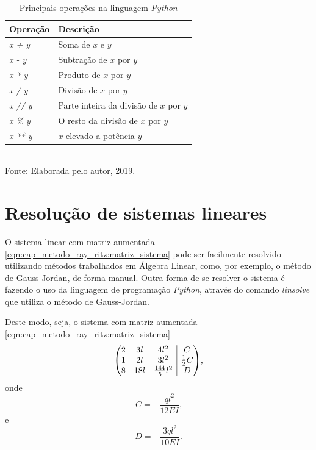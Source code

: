 \documentclass[
	12pt,				%
	openright,			%
    twoside,			%
	a4paper,			%
	chapter=TITLE,		%
	english,			%
	french,				%
	spanish,			%
	brazil				%
	]{abntex2}
\makeatletter
\newenvironment{amatrix}[1]{%
	\left(\begin{array}{@{}*{#1}{c}|c@{}}
}{%
	\end{array}\right)
}
\numberwithin{lema}{chapter}
\numberwithin{teorema}{chapter}
\numberwithin{definicao}{chapter}
\numberwithin{exemplo}{chapter}
\numberwithin{figure}{chapter}
\makeatother
\begin{document}
\begin{apendicesenv}
{	\begin{table}[h]
		\caption{Principais operações na linguagem \textit{Python}}
		\ABNTEXfontereduzida
		\centering
		\begin{tabular}{p{}p{}}
			\toprule
			\textbf{Operação} & \textbf{Descrição}\\
			\midrule
			\ABNTEXfontereduzida
			\textit{x + y} & Soma de $x$ e $y$\\
			\textit{x - y} & Subtração de $x$ por $y$\\
			\textit{x * y} & Produto de $x$ por $y$\\
			\textit{x / y} & Divisão de $x$ por $y$\\
			\textit{x // y} & Parte inteira da divisão de $x$ por $y$\\
			\textit{x \% y} & O resto da divisão de $x$ por $y$\\
			\textit{x ** y} & $x$ elevado a potência $y$\\
			\bottomrule
		\end{tabular}\\
		{\vspace{5pt}\ABNTEXfontereduzida Fonte: Elaborada pelo autor, 2019.}
		\label{table:principais_operacoes}
	\end{table}
	
	\section{Resolução de sistemas lineares}
	\label{sec:python_solve_linsys}
	
	O sistema linear com matriz aumentada \eqref{eqn:cap_metodo_ray_ritz:matriz_sistema} pode ser facilmente resolvido utilizando métodos trabalhados em Álgebra Linear, como, por exemplo, o método de Gauss-Jordan, de forma manual. Outra forma de se resolver o sistema é fazendo o uso da linguagem de programação \textit{Python}, através do comando \textit{linsolve} que utiliza o método de Gauss-Jordan.
	
	Deste modo, seja, o sistema com matriz aumentada \eqref{eqn:cap_metodo_ray_ritz:matriz_sistema}
	\begin{equation}
		\label{eqn:cap_ap_sis_lin:matriz_sistema}
		\begin{amatrix}{3}
			2 & 3l  & 4l^2 				 & C \\
			1 & 2l  & 3l^2				 & \frac{1}{2}C \\
			8 & 18l & \frac{144}{5} l^2 & D
		\end{amatrix}
		\text{,}
	\end{equation}
	onde 
	\begin{equation}
		\label{eqn:cap_ap_sis_lin:aux_var_C}
		C=-\frac{ql^2}{12EI}
		\text{,}
	\end{equation}
	e
	\begin{equation}
		\label{eqn:cap_ap_sis_lin:aux_var_D}
		D=-\frac{3ql^2}{10EI}
		\text{.}
	\end{equation}
	
}
\end{apendicesenv}
\end{document}

